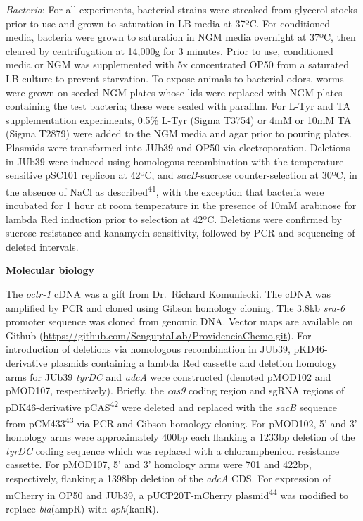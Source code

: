 \documentclass[11pt,]{article}
\begin{document}
\emph{Bacteria}: For all experiments, bacterial strains were streaked
from glycerol stocks prior to use and grown to saturation in LB media at
37ºC. For conditioned media, bacteria were grown to saturation in NGM
media overnight at 37ºC, then cleared by centrifugation at 14,000g for 3
minutes. Prior to use, conditioned media or NGM was supplemented with 5x
concentrated OP50 from a saturated LB culture to prevent starvation. To
expose animals to bacterial odors, worms were grown on seeded NGM plates
whose lids were replaced with NGM plates containing the test bacteria;
these were sealed with parafilm. For L-Tyr and TA supplementation
experiments, 0.5\% L-Tyr (Sigma T3754) or 4mM or 10mM TA (Sigma T2879)
were added to the NGM media and agar prior to pouring plates. Plasmids
were transformed into JUb39 and OP50 via electroporation. Deletions in
JUb39 were induced using homologous recombination with the
temperature-sensitive pSC101 replicon at 42ºC, and \emph{sacB}-sucrose
counter-selection at 30ºC, in the absence of NaCl as
described\textsuperscript{41}, with the exception that bacteria were
incubated for 1 hour at room temperature in the presence of 10mM
arabinose for lambda Red induction prior to selection at 42ºC. Deletions
were confirmed by sucrose resistance and kanamycin sensitivity, followed
by PCR and sequencing of deleted intervals.

\vspace{2\parsep}

\noindent   \textbf{Molecular biology}

The \emph{octr-1} cDNA was a gift from Dr.~Richard Komuniecki. The cDNA
was amplified by PCR and cloned using Gibson homology cloning. The 3.8kb
\emph{sra-6} promoter sequence was cloned from genomic DNA. Vector maps
are available on Github
(\url{https://github.com/SenguptaLab/ProvidenciaChemo.git}). For
introduction of deletions via homologous recombination in JUb39,
pKD46-derivative plasmids containing a lambda Red cassette and deletion
homology arms for JUb39 \textit{tyrDC} and \textit{adcA} were
constructed (denoted pMOD102 and pMOD107, respectively). Briefly, the
\emph{cas9} coding region and sgRNA regions of pDK46-derivative
pCAS\textsuperscript{42} were deleted and replaced with the \emph{sacB}
sequence from pCM433\textsuperscript{43} via PCR and Gibson homology
cloning. For pMOD102, 5' and 3' homology arms were approximately 400bp
each flanking a 1233bp deletion of the \textit{tyrDC} coding sequence
which was replaced with a chloramphenicol resistance cassette. For
pMOD107, 5' and 3' homology arms were 701 and 422bp, respectively,
flanking a 1398bp deletion of the \textit{adcA} CDS. For expression of
mCherry in OP50 and JUb39, a pUCP20T-mCherry plasmid\textsuperscript{44}
was modified to replace \emph{bla}(ampR) with \emph{aph}(kanR).
\end{document}
